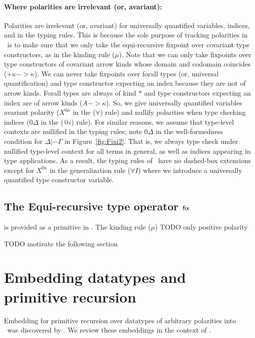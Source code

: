 \paragraph{Where polarities are irrelevant (or, avariant):}
Polarities are irrelevant (or, avariant) for universally quantified variables,
indices, and in the typing rules. This is because the sole purpose of tracking 
polarities in \Fixi\ is to make sure that we only take the equi-recursive
fixpoint over covariant type constructors, as in the kinding rule ($\mu$).
Note that we can only take fixpoints over type constructors of covariant
arrow kinds whose domain and codomain coincides ($+\kappa -> \kappa$).
We can never take fixpoints over forall types (or, universal quantification)
and type constructor expecting an index because they are not of arrow kinds.
Forall types are always of kind $*$ and type constructors expecting an index
are of arrow kinds ($A -> \kappa$). So, we give universally quantified variables
avariant polarity ($X^{0\kappa}$ in the ($\forall$) rule) and nullify polarities
when type checking indices ($0\Delta$ in the ($@i$) rule). For similar reasons,
we assume that type-level contexts are nullified in the typing rules;
note $0\Delta$ in the well-formedness condition for $\Delta |- \Gamma$
in Figure~\ref{fig:Fixi2}. That is, we always type check under nullified
type-level context for all terms in general, as well as indices appearing
in type applications. As a result, the typing rules of \Fixi\ have no dashed-box
extensions except for $X^{0\kappa}$ in the generalization rule ($\forall$$I$)
where we introduce a universally quantified type constructor variable.

\subsection{The Equi-recursive type operator $\mathsf{fix}$}
\label{ssec:fixi:def:equirec}
is provided as a primitive
in \Fixi.
The kinding rule ($\mu$) TODO only positive polarity


TODO motivate the following section

\section{Embedding datatypes and primitive recursion}
\label{sec:fixi:data}
Embedding for primitive recursion over datatypes of arbitrary polarities into
\Fixi\ was discovered by \citet{AbeMat04}. We review these embeddings
in the context of \Fixi.

